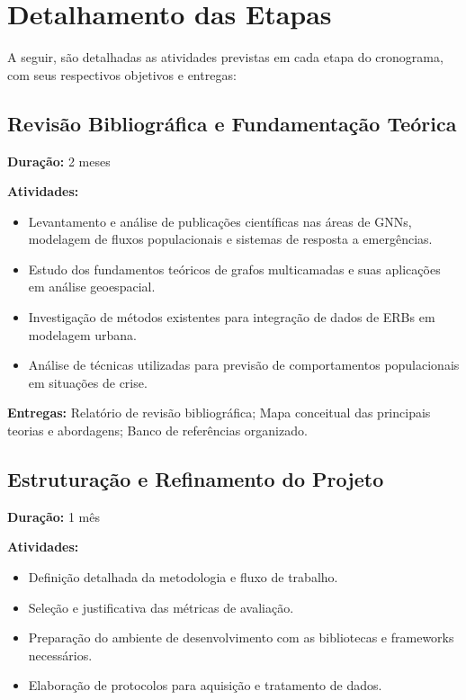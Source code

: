 \section{Detalhamento das Etapas}

A seguir, são detalhadas as atividades previstas em cada etapa do cronograma, com seus respectivos objetivos e entregas:

\subsection{Revisão Bibliográfica e Fundamentação Teórica}
\textbf{Duração:} 2 meses

\textbf{Atividades:}
\begin{itemize}[noitemsep]
    \item Levantamento e análise de publicações científicas nas áreas de \gls{GNN}s, modelagem de fluxos populacionais e sistemas de resposta a emergências.
    \item Estudo dos fundamentos teóricos de grafos multicamadas e suas aplicações em análise geoespacial.
    \item Investigação de métodos existentes para integração de dados de \gls{ERB}s em modelagem urbana.
    \item Análise de técnicas utilizadas para previsão de comportamentos populacionais em situações de crise.
\end{itemize}

\textbf{Entregas:} Relatório de revisão bibliográfica; Mapa conceitual das principais teorias e abordagens; Banco de referências organizado.

\subsection{Estruturação e Refinamento do Projeto}
\textbf{Duração:} 1 mês

\textbf{Atividades:}
\begin{itemize}[noitemsep]
    \item Definição detalhada da metodologia e fluxo de trabalho.
    \item Seleção e justificativa das métricas de avaliação.
    \item Preparação do ambiente de desenvolvimento com as bibliotecas e frameworks necessários.
    \item Elaboração de protocolos para aquisição e tratamento de dados.
\end{itemize}

